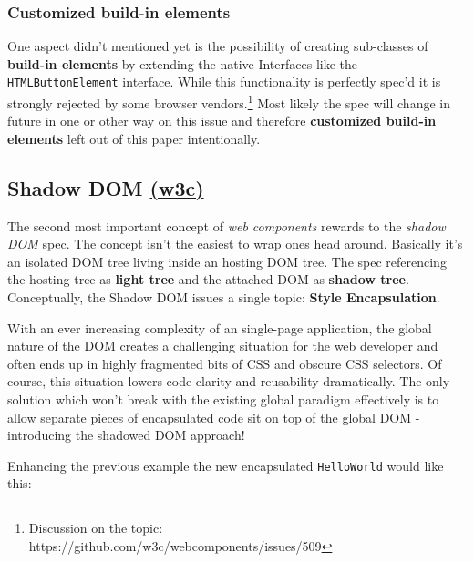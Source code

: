 \documentclass[]{assets/latex/ieee}
\begin{document}
\subsubsection{Customized build-in
elements}\label{customized-build-in-elements}

One aspect didn't mentioned yet is the possibility of creating
sub-classes of \textbf{build-in elements} by extending the native
Interfaces like the \texttt{HTMLButtonElement} interface. While this
functionality is perfectly spec'd it is strongly rejected by some
browser vendors.\footnote{Discussion on the topic:
  https://github.com/w3c/webcomponents/issues/509} Most likely the spec
will change in future in one or other way on this issue and therefore
\textbf{customized build-in elements} left out of this paper
intentionally.

\subsection{\texorpdfstring{Shadow DOM
\href{http://w3c.github.io/webcomponents/spec/shadow/}{(w3c)}}{Shadow DOM (w3c)}}\label{shadow-dom-w3c}

The second most important concept of \emph{web components} rewards to
the \emph{shadow DOM} spec. The concept isn't the easiest to wrap ones
head around. Basically it's an isolated DOM tree living inside an
hosting DOM tree. The spec referencing the hosting tree as \textbf{light
tree} and the attached DOM as \textbf{shadow tree}. Conceptually, the
Shadow DOM issues a single topic: \textbf{Style Encapsulation}.

With an ever increasing complexity of an single-page application, the
global nature of the DOM creates a challenging situation for the web
developer and often ends up in highly fragmented bits of CSS and obscure
CSS selectors. Of course, this situation lowers code clarity and
reusability dramatically. The only solution which won't break with the
existing global paradigm effectively is to allow separate pieces of
encapsulated code sit on top of the global DOM - introducing the
shadowed DOM approach!

Enhancing the previous example the new encapsulated \texttt{HelloWorld}
would like this:
\end{document}

